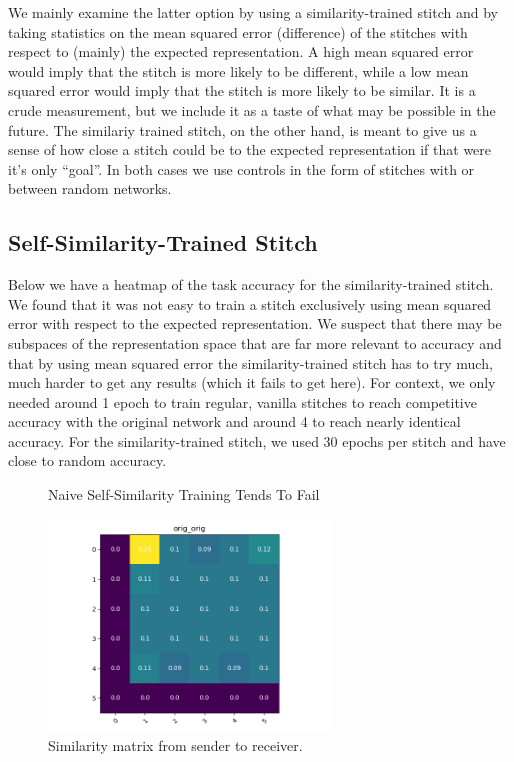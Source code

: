 \documentclass{article} %
\begin{document}
We mainly examine the latter option by using a similarity-trained stitch and by taking statistics on the mean squared
error (difference) of the stitches with respect to (mainly) the expected representation. A high mean squared error would
imply that the stitch is more likely to be different, while a low mean squared error would imply that the stitch is more
likely to be similar. It is a crude measurement, but we include it as a taste of what may be possible in the future. The
similariy trained stitch, on the other hand, is meant to give us a sense of how close a stitch could be to the expected
representation if that were it's only ``goal''. In both cases we use controls in the form of stitches with or between
random networks.

\subsection*{Self-Similarity-Trained Stitch}
Below we have a heatmap of the task accuracy for the similarity-trained stitch. We found that it was not
easy to train a stitch exclusively using mean squared error with respect to the expected representation. We suspect
that there may be subspaces of the representation space that are far more relevant to accuracy and that by using
mean squared error the similarity-trained stitch has to try much, much harder to get any results (which it fails
to get here). For context, we only needed around 1 epoch to train regular, vanilla stitches to reach competitive accuracy
with the original network and around 4 to reach nearly identical accuracy. For the similarity-trained stitch, we used 30
epochs per stitch and have close to random accuracy.

\label{Figure6}
\begin{center}
   \begin{figure}[h!]
      \centering
      \caption{Naive Self-Similarity Training Tends To Fail}
      \includegraphics[width=7.5cm]{resnet1111_1111_autoencoder.png}
      \caption*{Similarity matrix from sender to receiver.}
   \end{figure}
\end{center}
\end{document}
